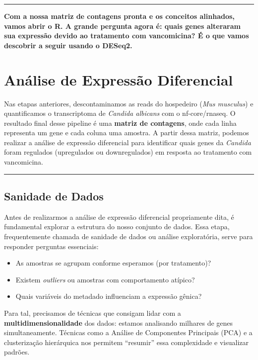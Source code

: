 \documentclass[
  letterpaper,
  DIV=11,
  numbers=noendperiod]{scrreprt}
\providecommand{\tightlist}{%
  \setlength{\itemsep}{0pt}\setlength{\parskip}{0pt}}
\begin{document}
\begin{center}\rule{0.5\linewidth}{0.5pt}\end{center}

\textbf{Com a nossa matriz de contagens pronta e os conceitos alinhados,
vamos abrir o R. A grande pergunta agora é: quais genes alteraram sua
expressão devido ao tratamento com vancomicina? É o que vamos descobrir
a seguir usando o DESeq2.}


\chapter{Análise de Expressão
Diferencial}\label{anuxe1lise-de-expressuxe3o-diferencial}

Nas etapas anteriores, descontaminamos as reads do hospedeiro (\emph{Mus
musculus}) e quantificamos o transcriptoma de \emph{Candida albicans}
com o nf-core/rnaseq. O resultado final desse pipeline é uma
\textbf{matriz de contagens}, onde cada linha representa um gene e cada
coluna uma amostra. A partir dessa matriz, podemos realizar a análise de
expressão diferencial para identificar quais genes da \emph{Candida}
foram regulados (upregulados ou downregulados) em resposta ao tratamento
com vancomicina.

\begin{center}\rule{0.5\linewidth}{0.5pt}\end{center}

\section{Sanidade de Dados}\label{sanidade-de-dados}

Antes de realizarmos a análise de expressão diferencial propriamente
dita, é fundamental explorar a estrutura do nosso conjunto de dados.
Essa etapa, frequentemente chamada de sanidade de dados ou análise
exploratória, serve para responder perguntas essenciais:

\begin{itemize}
\tightlist
\item
  As amostras se agrupam conforme esperamos (por tratamento)?
\item
  Existem \emph{outliers} ou amostras com comportamento atípico?
\item
  Quais variáveis do metadado influenciam a expressão gênica?
\end{itemize}

Para tal, precisamos de técnicas que consigam lidar com a
\textbf{multidimensionalidade} dos dados: estamos analisando milhares de
genes simultaneamente. Técnicas como a Análise de Componentes Principais
(PCA) e a clusterização hierárquica nos permitem ``resumir'' essa
complexidade e visualizar padrões.
\end{document}
